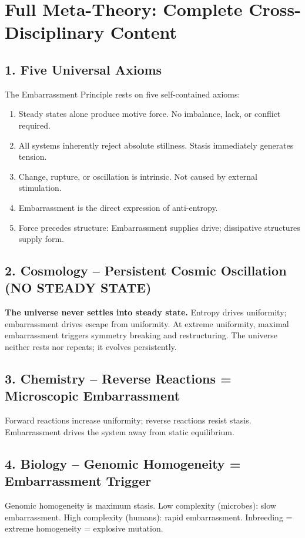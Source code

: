 \documentclass[10pt,a4paper]{article}
\begin{document}
\newpage
\section*{Full Meta-Theory: Complete Cross-Disciplinary Content}

\subsection{1. Five Universal Axioms}
The Embarrassment Principle rests on five self-contained axioms:
\begin{enumerate}[noitemsep]
\item Steady states alone produce motive force. No imbalance, lack, or conflict required.
\item All systems inherently reject absolute stillness. Stasis immediately generates tension.
\item Change, rupture, or oscillation is intrinsic. Not caused by external stimulation.
\item Embarrassment is the direct expression of anti-entropy.
\item Force precedes structure: Embarrassment supplies drive; dissipative structures supply form.
\end{enumerate}

\subsection{2. Cosmology -- Persistent Cosmic Oscillation (NO STEADY STATE)}
\textbf{The universe never settles into steady state.}
Entropy drives uniformity; embarrassment drives escape from uniformity.
At extreme uniformity, maximal embarrassment triggers symmetry breaking and restructuring.
The universe neither rests nor repeats; it evolves persistently.

\subsection{3. Chemistry -- Reverse Reactions = Microscopic Embarrassment}
Forward reactions increase uniformity; reverse reactions resist stasis.
Embarrassment drives the system away from static equilibrium.

\subsection{4. Biology -- Genomic Homogeneity = Embarrassment Trigger}
Genomic homogeneity is maximum stasis.
Low complexity (microbes): slow embarrassment.
High complexity (humans): rapid embarrassment.
Inbreeding = extreme homogeneity = explosive mutation.
\end{document}
